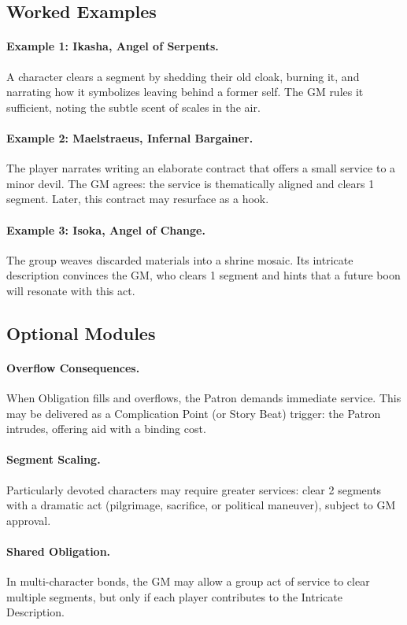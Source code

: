 \subsection{Worked Examples}\label{subsec:obligation-examples}
\paragraph{Example 1: Ikasha, Angel of Serpents.} A character clears a segment by shedding their old cloak, burning it, and narrating how it symbolizes leaving behind a former self. The GM rules it sufficient, noting the subtle scent of scales in the air.

\paragraph{Example 2: Maelstraeus, Infernal Bargainer.} The player narrates writing an elaborate contract that offers a small service to a minor devil. The GM agrees: the service is thematically aligned and clears 1 segment. Later, this contract may resurface as a hook.

\paragraph{Example 3: Isoka, Angel of Change.} The group weaves discarded materials into a shrine mosaic. Its intricate description convinces the GM, who clears 1 segment and hints that a future boon will resonate with this act.

\subsection{Optional Modules}\label{subsec:obligation-modules}
\paragraph{Overflow Consequences.} When Obligation fills and overflows, the Patron demands immediate service. This may be delivered as a Complication Point (or Story Beat) trigger: the Patron intrudes, offering aid with a binding cost.
\paragraph{Segment Scaling.} Particularly devoted characters may require greater services: clear 2 segments with a dramatic act (pilgrimage, sacrifice, or political maneuver), subject to GM approval.
\paragraph{Shared Obligation.} In multi-character bonds, the GM may allow a group act of service to clear multiple segments, but only if each player contributes to the Intricate Description.

